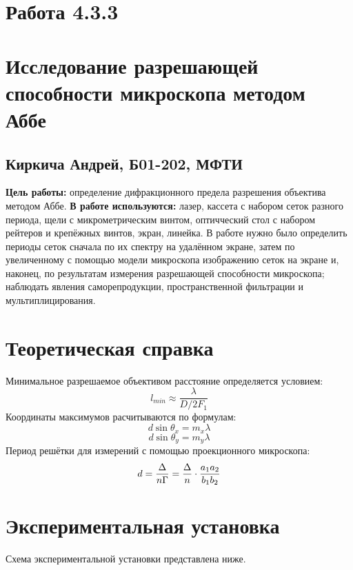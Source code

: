 


\section*{Работа 4.3.3}	
\section*{Исследование разрешающей способности микроскопа методом Аббе}
\subsection*{Киркича Андрей, Б01-202, МФТИ}
\n\n
\textbf{Цель работы: }
определение дифракционного предела разрешения объектива методом Аббе.
	\n\n
	\textbf{В работе используются: }
лазер, кассета с набором сеток разного периода, щели с микрометрическим винтом, оптичческий стол с набором рейтеров и крепёжных винтов, экран, линейка.
\n\n
В работе нужно было определить периоды сеток сначала по их спектру на удалённом экране, затем по увеличенному с помощью модели микроскопа изображению сеток на экране и, наконец, по результатам измерения разрешающей способности микроскопа; наблюдать явления саморепродукции, пространственной фильтрации и мультиплицирования.
\section*{Теоретическая справка}
Минимальное разрешаемое объективом расстояние определяется условием:
\[l_{min} \approx \frac{\lambda}{D / 2F_1}\]
\n
Координаты максимумов расчитываются по формулам:
\[d \sin \theta_x = m_x \lambda\]
\[d \sin \theta_y = m_y \lambda\]
Период решётки для измерений с помощью проекционного микроскопа:
\[d = \frac{\Delta}{n \Gamma} = \frac{\Delta}{n} \cdot \frac{a_1 a_2}{b_1 b_2}\]
\section*{Экспериментальная установка}
Схема экспериментальной установки представлена ниже.
